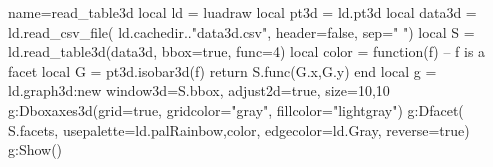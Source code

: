 \begin{luadraw}{name=read_table3d}
local ld = luadraw
local pt3d  = ld.pt3d
local data3d = ld.read_csv_file( ld.cachedir.."data3d.csv", {header=false, sep=" "})
local S = ld.read_table3d(data3d, {bbox=true, func=4})
local color = function(f) -- f is a facet
    local G = pt3d.isobar3d(f)
    return S.func(G.x,G.y)
end
local g = ld.graph3d:new{ window3d=S.bbox, adjust2d=true, size={10,10} }
g:Dboxaxes3d({grid=true, gridcolor="gray", fillcolor="lightgray"})
g:Dfacet( S.facets, {usepalette={ld.palRainbow,color}, edgecolor=ld.Gray, reverse=true})
g:Show()
\end{luadraw}
